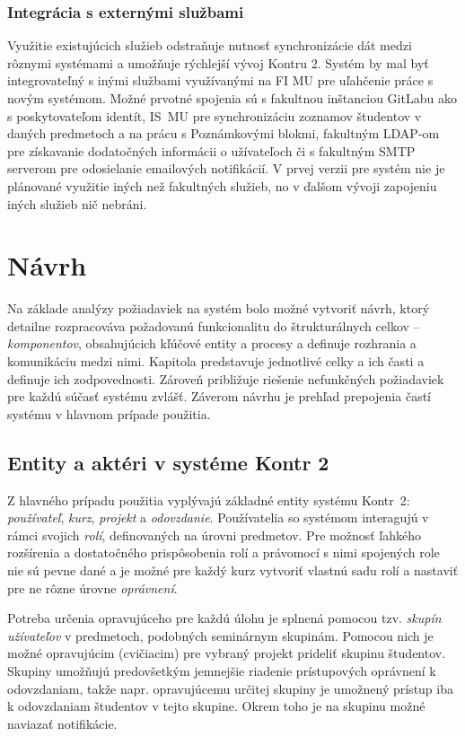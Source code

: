 \documentclass[
  digital, %
  oneside, %
  table,   %
  lof,     %
  lot,   %
]{fithesis3}
\begin{document}
\subsection{Integrácia s externými službami}
Využitie existujúcich služieb odstraňuje nutnosť synchronizácie dát medzi rôznymi systémami a umožňuje rýchlejší vývoj Kontru 2. Systém by mal byť integrovateľný s inými službami využívanými na FI MU pre uľahčenie práce s novým systémom. Možné prvotné spojenia sú s fakultnou inštanciou GitLabu ako s poskytovateľom identít, IS~MU pre synchronizáciu zoznamov študentov v daných predmetoch a na prácu s Poznámkovými blokmi, fakultným LDAP-om pre získavanie dodatočných informácii o užívateľoch či s fakultným SMTP serverom pre odosielanie emailových notifikácií. V prvej verzii pre systém nie je plánované využitie iných než fakultných služieb, no v ďalšom vývoji zapojeniu iných služieb nič nebráni.

\chapter{Návrh}
Na základe analýzy požiadaviek na systém bolo možné vytvoriť návrh, ktorý detailne rozpracováva požadovanú funkcionalitu do štrukturálnych celkov -- \emph{komponentov}, obsahujúcich kľúčové entity a procesy a definuje rozhrania a komunikáciu medzi nimi. Kapitola predstavuje jednotlivé celky a ich časti a definuje ich zodpovednosti. Zároveň približuje riešenie nefunkčných požiadaviek pre každú súčasť systému zvlášť. Záverom návrhu je prehľad prepojenia častí systému v hlavnom prípade použitia. 

\section{Entity a aktéri v systéme Kontr 2}

Z hlavného prípadu použitia vyplývajú základné entity systému Kontr~2: \emph{používateľ}, \emph{kurz}, \emph{projekt} a \emph{odovzdanie}. Používatelia so systémom interagujú v rámci svojich \emph{rolí}, definovaných na úrovni predmetov. Pre možnosť ľahkého rozšírenia a dostatočného prispôsobenia rolí a právomocí s nimi spojených role nie sú pevne dané a je možné pre každý kurz vytvoriť vlastnú sadu rolí a nastaviť pre ne rôzne úrovne \emph{oprávnení}.

Potreba určenia opravujúceho pre každú úlohu je splnená pomocou tzv. \emph{skupín užívateľov} v predmetoch, podobných seminárnym skupinám. Pomocou nich je možné opravujúcim (cvičiacim) pre vybraný projekt prideliť skupinu študentov. Skupiny umožňujú predovšetkým jemnejšie riadenie prístupových oprávnení k odovzdaniam, takže napr. opravujúcemu určitej skupiny je umožnený prístup iba k odovzdaniam študentov v tejto skupine. Okrem toho je na skupinu možné naviazať notifikácie.
\end{document}
